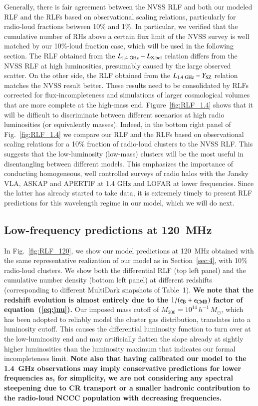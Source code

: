 \documentclass[useAMS,usenatbib]{mn2e}
\begin{document}
Generally, there is fair agreement between the NVSS RLF and both our modeled RLF
and the RLFs based on observational scaling relations, particularly for
radio-loud fractions between 10\% and 1\%. In particular, we verified that the
cumulative number of RHs above a certain flux limit of the NVSS survey is well
matched by our 10\%-loud fraction case, which will be used in the following
section.  The RLF obtained from the $L_{1.4~{\mathrm{GHz}}}-L_{{\mathrm{X,bol}}}$ relation
differs from the NVSS RLF at high luminosities, presumably caused by the large
observed scatter.  On the other side, the RLF obtained from the
$L_{1.4~{\mathrm{GHz}}}-Y_{{\mathrm{SZ}}}$ relation matches the NVSS result better. These
results need to be consolidated by RLFs corrected for flux-incompleteness and
simulations of larger cosmological volumes that are more complete at the
high-mass end. Figure~\ref{fig:RLF_1.4} shows that it will be difficult to
discriminate between different scenarios at high radio luminosities (or
equivalently masses). Indeed, in the bottom right panel of
Fig.~\ref{fig:RLF_1.4} we compare our RLF and the RLFs based on observational
scaling relations for a 10\% fraction of radio-loud clusters to the NVSS
RLF. This suggests that the low-luminosity (low-mass) clusters will be the most
useful in disentangling between different models. This emphasizes the importance
of conducting homogeneous, well controlled surveys of radio halos with the
Jansky VLA, ASKAP \citep{2011PASA...28..215N} and APERTIF
\citep{2012JApA..tmp...34R} at 1.4 GHz and LOFAR at lower frequencies. Since the
latter has already started to take data, it is extremely timely to present RLF
predictions for this wavelength regime in our model, which we will do next.


\subsection{Low-frequency predictions at 120~MHz}

In Fig.~\ref{fig:RLF_120}, we show our model predictions at 120~MHz obtained
with the same representative realization of our model as in Section~\ref{sec:4},
with 10\% radio-loud clusters. We show both the differential RLF (top left
panel) and the cumulative number density (bottom left panel) at different
redshifts (corresponding to different MultiDark snapshots of Table~1). 
{\bf We note that the redshift evolution is almost entirely due to the 
$1/(\epsilon_{{\mathrm{B}}}+\epsilon_{{\mathrm{CMB}}})$ factor of equation~(\ref{eq:jnu}).}
Our imposed mass cutoff of $M_{200}=10^{14}\,h^{-1}\,M_\odot$, which has
been adopted to reliably model the cluster gas distribution, translates into a
luminosity cutoff. This causes the differential luminosity function to turn over
at the low-luminosity end and may artificially flatten the slope already at
sightly higher luminosities than the luminosity maximum that indicates our formal
incompleteness limit. {\bf Note also that having calibrated our model to the 
1.4~GHz observations may imply conservative predictions for lower frequencies
as, for simplicity, we are not considering any spectral steepening due to CR
transport or a smaller hadronic contribution to the radio-loud
NCCC population with decreasing frequencies.}
\end{document}
